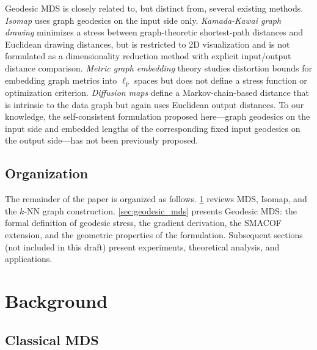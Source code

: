 \documentclass[twoside,11pt]{article}
\begin{document}
Geodesic MDS is closely related to, but distinct from, several existing
methods.  \emph{Isomap} \citep{tenenbaum2000global} uses graph geodesics
on the input side only.  \emph{Kamada-Kawai graph drawing}
\citep{kamada1989algorithm} minimizes a stress between graph-theoretic
shortest-path distances and Euclidean drawing distances, but is restricted
to 2D visualization and is not formulated as a dimensionality reduction
method with explicit input/output distance comparison.  \emph{Metric graph
embedding} theory \citep{bourgain1985lipschitz,
linial1994geometry} studies distortion bounds for embedding graph metrics
into $\ell_p$ spaces but does not define a stress function or optimization
criterion.  \emph{Diffusion maps} \citep{coifman2006diffusion} define a
Markov-chain-based distance that is intrinsic to the data graph but again
uses Euclidean output distances.  To our knowledge, the self-consistent
formulation proposed here---graph geodesics on the input side and
embedded lengths of the corresponding fixed input geodesics on the output
side---has not been previously proposed.

\subsection{Organization}

The remainder of the paper is organized as follows.
\cref{sec:background} reviews MDS, Isomap, and the $k$-NN graph construction.
\cref{sec:geodesic_mds} presents Geodesic MDS: the formal definition of
geodesic stress, the gradient derivation, the SMACOF extension, and the
geometric properties of the formulation.
Subsequent sections (not included in this draft) present experiments,
theoretical analysis, and applications.

\section{Background}
\label{sec:background}

\subsection{Classical MDS}
\label{sec:classical_mds}
\end{document}
